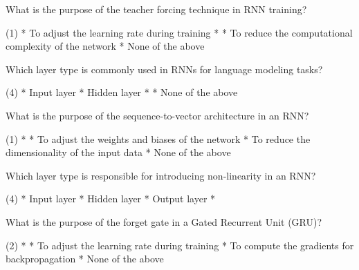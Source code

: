 \documentclass[10pt]{extarticle}
\begin{document}
\begin{exercise}
    What is the purpose of the teacher forcing technique in RNN training?
    \begin{choice} (1)
        * To adjust the learning rate during training
        * 
        * To reduce the computational complexity of the network
        * None of the above
    \end{choice}
\end{exercise}
\begin{solution}
\end{solution}

\begin{exercise}
    Which layer type is commonly used in RNNs for language modeling tasks?
    \begin{choice} (4)
        * Input layer
        * Hidden layer
        * 
        * None of the above
    \end{choice}
\end{exercise}
\begin{solution}
\end{solution}

\begin{exercise}
    What is the purpose of the sequence-to-vector architecture in an RNN?
    \begin{choice} (1)
        * 
        * To adjust the weights and biases of the network
        * To reduce the dimensionality of the input data
        * None of the above
    \end{choice}
\end{exercise}
\begin{solution}
\end{solution}

\begin{exercise}
    Which layer type is responsible for introducing non-linearity in an RNN?
    \begin{choice} (4)
        * Input layer
        * Hidden layer
        * Output layer
        * 
    \end{choice}
\end{exercise}
\begin{solution}
\end{solution}

\begin{exercise}
    What is the purpose of the forget gate in a Gated Recurrent Unit (GRU)?
    \begin{choice} (2)
        * 
        * To adjust the learning rate during training
        * To compute the gradients for backpropagation
        * None of the above
    \end{choice}
\end{exercise}
\begin{solution}
\end{solution}
\end{document}
